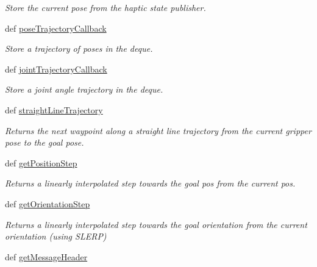 \begin{DoxyCompactItemize}
\begin{DoxyCompactList}\small\item\em \-Store the current pose from the haptic state publisher. \end{DoxyCompactList}\item 
def \hyperlink{classhrl__haptic__mpc_1_1waypoint__generator_1_1_waypoint_generator_a561b653c3e26125aec6b43a839864ceb}{pose\-Trajectory\-Callback}
\begin{DoxyCompactList}\small\item\em \-Store a trajectory of poses in the deque. \end{DoxyCompactList}\item 
def \hyperlink{classhrl__haptic__mpc_1_1waypoint__generator_1_1_waypoint_generator_a844cc462dc6ee20c79abde6b70e3af41}{joint\-Trajectory\-Callback}
\begin{DoxyCompactList}\small\item\em \-Store a joint angle trajectory in the deque. \end{DoxyCompactList}\item 
def \hyperlink{classhrl__haptic__mpc_1_1waypoint__generator_1_1_waypoint_generator_ace26ac9b4775acf54d78d7e445dcec19}{straight\-Line\-Trajectory}
\begin{DoxyCompactList}\small\item\em \-Returns the next waypoint along a straight line trajectory from the current gripper pose to the goal pose. \end{DoxyCompactList}\item 
def \hyperlink{classhrl__haptic__mpc_1_1waypoint__generator_1_1_waypoint_generator_ac59d8fa9e0b598b7c5d881f186fbe521}{get\-Position\-Step}
\begin{DoxyCompactList}\small\item\em \-Returns a linearly interpolated step towards the goal pos from the current pos. \end{DoxyCompactList}\item 
def \hyperlink{classhrl__haptic__mpc_1_1waypoint__generator_1_1_waypoint_generator_a577da256848653c256e7c1c81da34872}{get\-Orientation\-Step}
\begin{DoxyCompactList}\small\item\em \-Returns a linearly interpolated step towards the goal orientation from the current orientation (using \-S\-L\-E\-R\-P) \end{DoxyCompactList}\item 
\hypertarget{classhrl__haptic__mpc_1_1waypoint__generator_1_1_waypoint_generator_ac2094b77d066d963defcf70583460770}{def \hyperlink{classhrl__haptic__mpc_1_1waypoint__generator_1_1_waypoint_generator_ac2094b77d066d963defcf70583460770}{get\-Message\-Header}}\label{classhrl__haptic__mpc_1_1waypoint__generator_1_1_waypoint_generator_ac2094b77d066d963defcf70583460770}


\end{DoxyCompactItemize}
